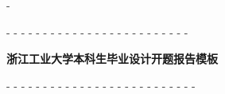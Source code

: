-\documentclass[proposal]{zjutreport}
\begin{document}
-
-%
-
-%
-
-%
-
-%
-
-%
-
-%
-
-
-      %
-
-\frontmatter
-
-
-\begingroup %
-\let\clearpage\relax %
-
-%
-\vspace*{10.0mm}
-\centerline{\sihao\heiti\bfseries{浙江工业大学本科生毕业设计开题报告模板}}
-\vspace*{5.0mm}
-
-%
-%
-
-%
-\mainmatter
-%
-
-
-
-
-
-%
-\backmatter
-\endgroup %
-%
-\clearpage %
-
-\nocite{*}                                   %
-
-%
-%
-%
-
-
\end{document}

